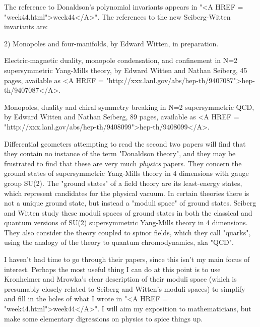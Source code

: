 The reference to Donaldson's polynomial invariants appears in "<A HREF = "week44.html">week44</A>".
The references to the new Seiberg-Witten invariants are:


2) Monopoles and four-manifolds, by Edward Witten, in preparation.  
 
Electric-magnetic duality, monopole condensation, and confinement in N=2
supersymmetric Yang-Mills theory, by Edward Witten and Nathan Seiberg,
45 pages, available as <A HREF = "http://xxx.lanl.gov/abs/hep-th/9407087">hep-th/9407087</A>.

Monopoles, duality and chiral symmetry breaking in N=2 supersymmetric
QCD, by Edward Witten and Nathan Seiberg, 89 pages, available as
<A HREF = "http://xxx.lanl.gov/abs/hep-th/9408099">hep-th/9408099</A>.  


Differential geometers attempting to read the second two papers will
find that they contain no instance of the term "Donaldson theory", and
they may be frustrated to find that these are very much \emph{physics} papers.
They concern the ground states of supersymmetric Yang-Mills theory in 4
dimensions with gauge group SU(2).  The "ground states" of a field
theory are its least-energy states, which represent candidates for the
physical vacuum.  In certain theories there is not a unique ground
state, but instead a "moduli space" of ground states.  Seiberg and
Witten study these moduli spaces of ground states in both the classical
and quantum versions of SU(2) supersymmetric Yang-Mills theory in 4
dimensions.  They also consider the theory coupled to spinor fields,
which they call "quarks", using the analogy of the theory to quantum
chromodynamics, aka "QCD".

I haven't had time to go through their papers, since this isn't my main
focus of interest.  Perhaps the most useful thing I can do at this point
is to use Kronheimer and Mrowka's clear description of their moduli
space (which is presumably closely related to Seiberg and Witten's
moduli spaces) to simplify and fill in the holes of what I wrote in
"<A HREF = "week44.html">week44</A>".  I will aim my exposition to mathematicians, but make some
elementary digressions on physics to spice things up.

